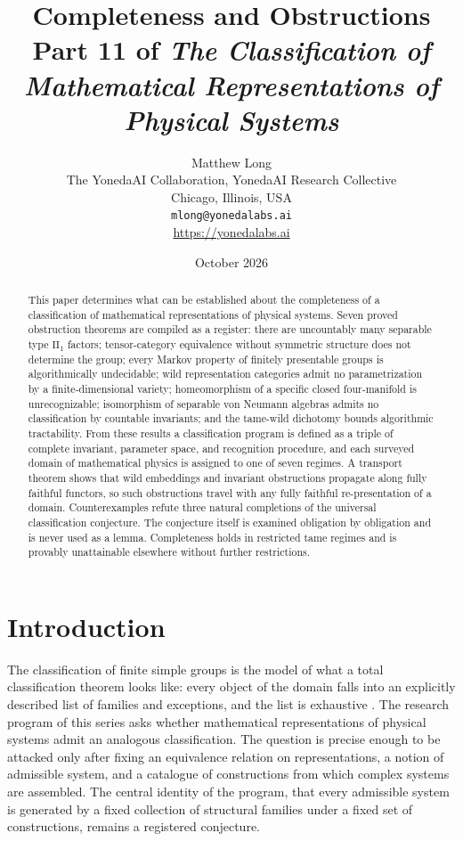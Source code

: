 \documentclass[11pt,letterpaper]{article}
\title{Completeness and Obstructions\\[4pt]
  {\normalsize Part 11 of \emph{The Classification of Mathematical Representations of Physical Systems}}}
\author{Matthew Long\\
  \small The YonedaAI Collaboration, YonedaAI Research Collective\\
  \small Chicago, Illinois, USA\\
  \small \texttt{mlong@yonedalabs.ai}\\
  \small \url{https://yonedalabs.ai}}
\date{October 2026}
\theoremstyle{definition}
\theoremstyle{remark}
\begin{document}
\maketitle

\begin{abstract}
This paper determines what can be established about the completeness of a classification of mathematical representations of physical systems. Seven proved obstruction theorems are compiled as a register: there are uncountably many separable type $\mathrm{II}_1$ factors; tensor-category equivalence without symmetric structure does not determine the group; every Markov property of finitely presentable groups is algorithmically undecidable; wild representation categories admit no parametrization by a finite-dimensional variety; homeomorphism of a specific closed four-manifold is unrecognizable; isomorphism of separable von Neumann algebras admits no classification by countable invariants; and the tame-wild dichotomy bounds algorithmic tractability. From these results a classification program is defined as a triple of complete invariant, parameter space, and recognition procedure, and each surveyed domain of mathematical physics is assigned to one of seven regimes. A transport theorem shows that wild embeddings and invariant obstructions propagate along fully faithful functors, so such obstructions travel with any fully faithful re-presentation of a domain. Counterexamples refute three natural completions of the universal classification conjecture. The conjecture itself is examined obligation by obligation and is never used as a lemma. Completeness holds in restricted tame regimes and is provably unattainable elsewhere without further restrictions.
\end{abstract}

\section{Introduction}

The classification of finite simple groups is the model of what a total classification theorem looks like: every object of the domain falls into an explicitly described list of families and exceptions, and the list is exhaustive \cite{solomon2001}. The research program of this series asks whether mathematical representations of physical systems admit an analogous classification. The question is precise enough to be attacked only after fixing an equivalence relation on representations, a notion of admissible system, and a catalogue of constructions from which complex systems are assembled. The central identity of the program, that every admissible system is generated by a fixed collection of structural families under a fixed set of constructions, remains a registered conjecture.
\end{document}
